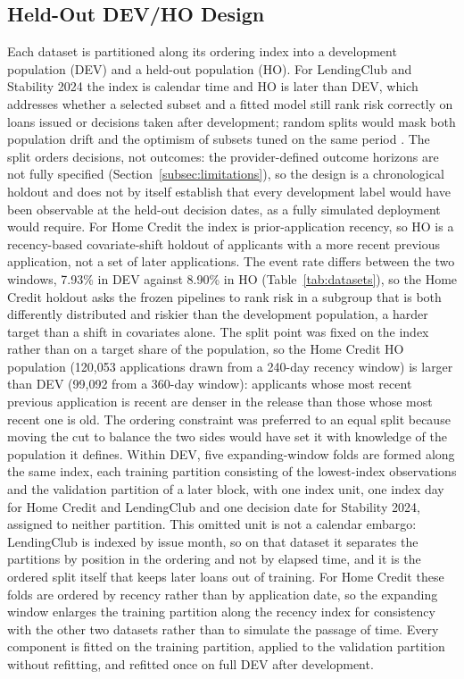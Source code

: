 \documentclass[final,5p,twocolumn]{elsarticle}
\begin{document}
\subsection{Held-Out DEV/HO Design}
\label{subsec:dev_oot}

Each dataset is partitioned along its ordering index into a development population (DEV) and a held-out population (HO). For LendingClub and Stability 2024 the index is calendar time and HO is later than DEV, which addresses whether a selected subset and a fitted model still rank risk correctly on loans issued or decisions taken after development; random splits would mask both population drift and the optimism of subsets tuned on the same period \cite{bergmeir2012,gama2014}. The split orders decisions, not outcomes: the provider-defined outcome horizons are not fully specified (Section~\ref{subsec:limitations}), so the design is a chronological holdout and does not by itself establish that every development label would have been observable at the held-out decision dates, as a fully simulated deployment would require. For Home Credit the index is prior-application recency, so HO is a recency-based covariate-shift holdout of applicants with a more recent previous application, not a set of later applications. The event rate differs between the two windows, 7.93\% in DEV against 8.90\% in HO (Table~\ref{tab:datasets}), so the Home Credit holdout asks the frozen pipelines to rank risk in a subgroup that is both differently distributed and riskier than the development population, a harder target than a shift in covariates alone. The split point was fixed on the index rather than on a target share of the population, so the Home Credit HO population (120,053 applications drawn from a 240-day recency window) is larger than DEV (99,092 from a 360-day window): applicants whose most recent previous application is recent are denser in the release than those whose most recent one is old. The ordering constraint was preferred to an equal split because moving the cut to balance the two sides would have set it with knowledge of the population it defines. Within DEV, five expanding-window folds are formed along the same index, each training partition consisting of the lowest-index observations and the validation partition of a later block, with one index unit, one index day for Home Credit and LendingClub and one decision date for Stability 2024, assigned to neither partition. This omitted unit is not a calendar embargo: LendingClub is indexed by issue month, so on that dataset it separates the partitions by position in the ordering and not by elapsed time, and it is the ordered split itself that keeps later loans out of training. For Home Credit these folds are ordered by recency rather than by application date, so the expanding window enlarges the training partition along the recency index for consistency with the other two datasets rather than to simulate the passage of time. Every component is fitted on the training partition, applied to the validation partition without refitting, and refitted once on full DEV after development.
\end{document}
